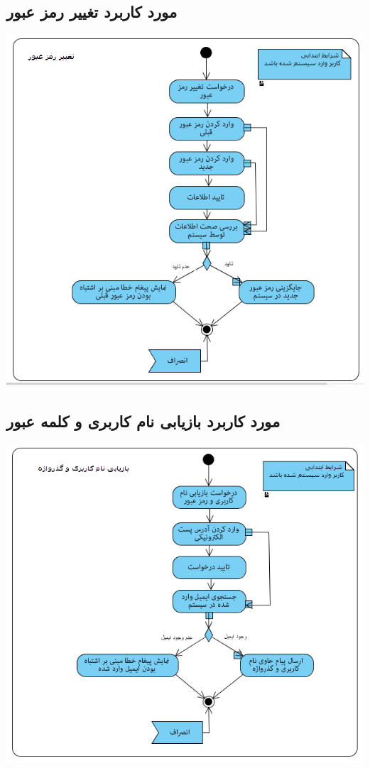 \subsection*{مورد کاربرد تغییر رمز عبور}
\vspace{2cm}
\begin{center}
\includegraphics[width=\textwidth]{ActivityDiagrams/12.png}
\end{center}

\newpage
\vspace{2cm}
\subsection*{مورد کاربرد بازیابی نام کاربری و کلمه عبور}
\vspace{2cm}
\begin{center}
\includegraphics[width=\textwidth]{ActivityDiagrams/13.png}
\end{center}

